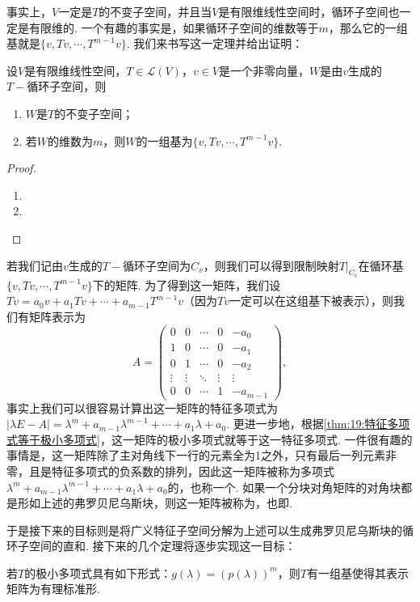 事实上，$V$一定是$T$的不变子空间，并且当$V$是有限维线性空间时，循环子空间也一定是有限维的. 一个有趣的事实是，如果循环子空间的维数等于$m$，那么它的一组基就是$\{v,Tv,\cdots,T^{m-1}v\}$. 我们来书写这一定理并给出证明：
\begin{theorem}
    设$V$是有限维线性空间，$T\in\mathcal{L}(V)$，$v\in V$是一个非零向量，$W$是由$v$生成的$T-\text{循环子空间}$，则
    \begin{enumerate}
        \item $W$是$T$的不变子空间；
        \item 若$W$的维数为$m$，则$W$的一组基为$\{v,Tv,\cdots,T^{m-1}v\}$.
    \end{enumerate}
\end{theorem}
\begin{proof}
    \begin{enumerate}
        \item
        \item
    \end{enumerate}
\end{proof}

若我们记由$v$生成的$T-\text{循环子空间}$为$C_v$，则我们可以得到限制映射$T|_{C_v}$在循环基$\{v,Tv,\cdots,T^{m-1}v\}$下的矩阵. 为了得到这一矩阵，我们设$Tv=a_0v+a_1Tv+\cdots+a_{m-1}T^{m-1}v$（因为$Tv$一定可以在这组基下被表示），则我们有矩阵表示为
\[A=\begin{pmatrix}
    0 & 0 & \cdots & 0 & -a_0 \\
    1 & 0 & \cdots & 0 & -a_1 \\
    0 & 1 & \cdots & 0 & -a_2 \\
    \vdots & \vdots & \ddots & \vdots & \vdots \\
    0 & 0 & \cdots & 1 & -a_{m-1}
\end{pmatrix},\]
事实上我们可以很容易计算出这一矩阵的特征多项式为$|\lambda E-A|=\lambda^m+a_{m-1}\lambda^{m-1}+\cdots+a_1\lambda+a_0$. 更进一步地，根据\autoref{thm:19:特征多项式等于极小多项式}，这一矩阵的极小多项式就等于这一特征多项式. 一件很有趣的事情是，这一矩阵除了主对角线下一行的元素全为1之外，只有最后一列元素非零，且是特征多项式的负系数的排列，因此这一矩阵被称为多项式$\lambda^m+a_{m-1}\lambda^{m-1}+\cdots+a_1\lambda+a_0$的，也称一个. 如果一个分块对角矩阵的对角块都是形如上述的弗罗贝尼乌斯块，则这一矩阵被称为，也即.

于是接下来的目标则是将广义特征子空间分解为上述可以生成弗罗贝尼乌斯块的循环子空间的直和. 接下来的几个定理将逐步实现这一目标：
\begin{theorem}
    若$T$的极小多项式具有如下形式：$g(\lambda)=(p(\lambda))^m$，则$T$有一组基使得其表示矩阵为有理标准形.
\end{theorem}

